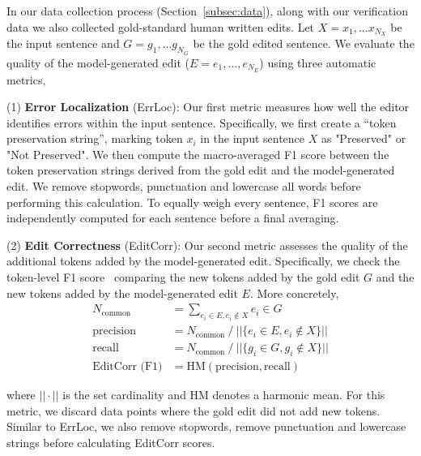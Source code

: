 \documentclass[11pt]{article}
\begin{document}
In our data collection process (Section~\ref{subsec:data}), along with our verification data we also collected gold-standard human written edits. Let $X = x_1,...x_{N_X}$ be the input sentence and $G = g_1,...g_{N_G}$ be the gold edited sentence.
We evaluate the quality of the model-generated edit ($E = e_1,...,e_{N_E}$) using three automatic metrics,

\vspace{0.3em}

\noindent (1) \textbf{Error Localization} (ErrLoc): Our first metric measures how well the editor identifies errors within the input sentence. Specifically, we first create a ``token preservation string'', marking token $x_i$ in the input sentence $X$ as "Preserved" or "Not Preserved". We then compute the macro-averaged F1 score between the token preservation strings derived from the gold edit and the model-generated edit. We remove stopwords, punctuation and lowercase all words before performing this calculation. To equally weigh every sentence, F1 scores are independently computed for each sentence before a final averaging.

\vspace{0.3em}

\noindent (2) \textbf{Edit Correctness} (EditCorr): Our second metric assesses the quality of the additional tokens added by the model-generated edit. Specifically, we check the token-level F1 score~\citep{rajpurkar2016squad} comparing the new tokens added by the gold edit $G$ and the new tokens added by the model-generated edit $E$. More concretely,
\begin{align*}
N_\text{common} &= \sum_{e_i \in E, e_i \notin X} e_i \in G \\
\text{precision} &= N_\text{common} ~/~ || \{e_i \in E, e_i \notin X\} || \\
\text{recall} &= N_\text{common} ~/~ || \{g_i \in G, g_i \notin X\} || \\
\text{EditCorr (F1)} &= \text{HM} (\text{precision}, \text{recall})
\end{align*}

where $||\cdot||$ is the set cardinality and HM denotes a harmonic mean. For this metric, we discard data points where the gold edit did not add new tokens. Similar to ErrLoc, we also remove stopwords, remove punctuation and lowercase strings before calculating EditCorr scores.

\vspace{.3em}
\end{document}
